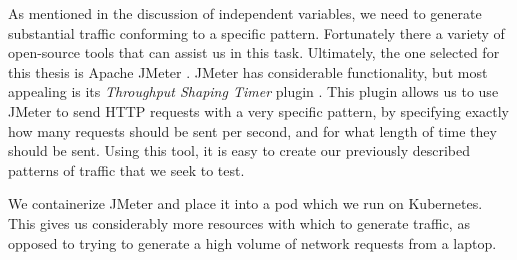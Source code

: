 As mentioned in the discussion of independent variables, we need to generate
substantial traffic conforming to a specific pattern. Fortunately there a
variety of open-source tools that can assist us in this task. Ultimately, the
one selected for this thesis is Apache JMeter \cite{apache-jmeter}. JMeter has
considerable functionality, but most appealing is its \textit{Throughput Shaping
Timer} plugin \cite{throughput-shaping-timer-plugin}. This plugin allows us to
use JMeter to send HTTP requests with a very specific pattern, by specifying
exactly how many requests should be sent per second, and for what length of time
they should be sent. Using this tool, it is easy to create our previously
described patterns of traffic that we seek to test.

We containerize JMeter and place it into a pod which we run on Kubernetes. This
gives us considerably more resources with which to generate traffic, as opposed
to trying to generate a high volume of network requests from a laptop.
